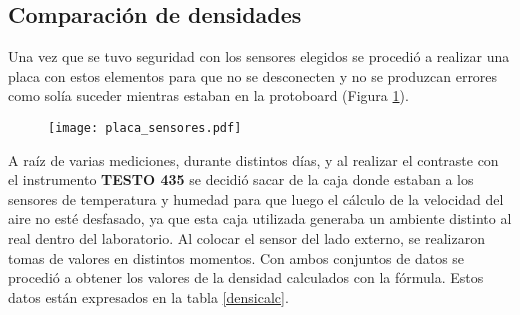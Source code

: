 \subsection{Comparación de densidades} \label{cap:densidades}

Una vez que se tuvo seguridad con los sensores elegidos se procedió a realizar una placa con estos elementos para que no se desconecten y no se produzcan errores como solía suceder mientras estaban en la protoboard (Figura \ref{fig:sensoresa}). \\
\begin{figure}[H]
	\centering
	\texttt{[image: placa\_sensores.pdf]}
	\label{fig:sensoresa}
\end{figure}

A raíz de varias mediciones, durante distintos días, y al realizar el contraste con el instrumento \textbf{TESTO 435} se decidió sacar de la caja donde estaban a los sensores de temperatura y humedad para que luego el cálculo de la velocidad del aire no esté desfasado, ya que esta caja utilizada generaba un ambiente distinto al real dentro del laboratorio. Al colocar el sensor del lado externo, se realizaron tomas de valores en distintos momentos. Con ambos conjuntos de datos se procedió a obtener los valores de la densidad calculados con la fórmula. Estos datos están expresados en la tabla \ref{densicalc}. 


